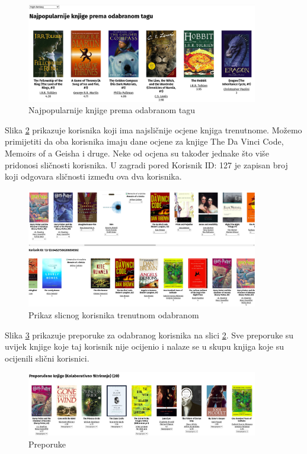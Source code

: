 \documentclass[]{foi}
\begin{document}
\begin{figure}[h!]
	\centering
	\includegraphics[width=0.9\textwidth]{slike/prema_tagu.png}
	\caption{Najpopularnije knjige prema odabranom tagu}
	\label{fig:prema_tagu}
\end{figure}

Slika \ref{fig:slicni} prikazuje korisnika koji ima najsličnije ocjene knjiga trenutnome.
Možemo primijetiti da oba korisnika imaju dane ocjene za knjige The Da Vinci Code, Memoirs of a Geisha i druge.
Neke od ocjena su također jednake što više pridonosi sličnosti korisnika. U zagradi pored Korisnik ID: 127 je zapisan
broj koji odgovara sličnosti između ova dva korisnika.
\pagebreak

\begin{figure}[h!]
	\centering
	\includegraphics[width=0.9\textwidth]{slike/slicni_korisnik_15.png}
	\caption{Prikaz slicnog korisnika trenutnom odabranom}
	\label{fig:slicni}
\end{figure}

Slika \ref{fig:preporuke} prikazuje preporuke za odabranog korisnika na slici \ref{fig:slicni}.
Sve preporuke su uvijek knjige koje taj korisnik nije ocijenio i nalaze se u skupu knjiga koje su ocijenili
slični korisnici.

\begin{figure}[h!]
	\centering
	\includegraphics[width=0.9\textwidth]{slike/preporuke.png}
	\caption{Preporuke}
	\label{fig:preporuke}
\end{figure}
\end{document}
